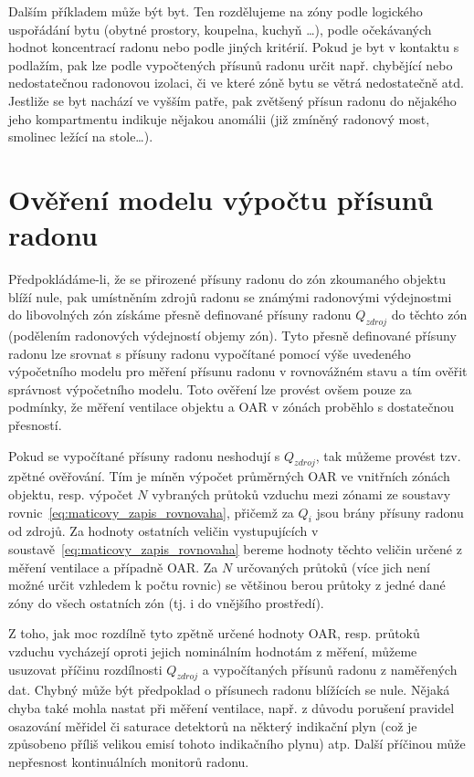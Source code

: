 Dalším příkladem může být byt. Ten rozdělujeme na zóny podle logického uspořádání bytu (obytné prostory, koupelna, kuchyň \ldots), podle očekávaných hodnot koncentrací radonu nebo podle jiných kritérií.
Pokud je byt v kontaktu s podlažím, pak lze podle vypočtených přísunů radonu určit např. chybějící nebo nedostatečnou radonovou izolaci, či ve které zóně bytu se větrá nedostatečně atd. Jestliže se byt nachází ve vyšším patře, pak zvětšený přísun radonu do nějakého jeho kompartmentu indikuje nějakou anomálii (již zmíněný radonový most, smolinec ležící na stole\ldots).


\section{Ověření modelu výpočtu přísunů radonu}\label{navesti:model_overeni}
Předpokládáme-li, že se přirozené přísuny radonu do zón zkoumaného objektu blíží nule, pak umístněním zdrojů radonu se známými radonovými výdejnostmi do libovolných zón získáme přesně definované přísuny radonu $Q_{zdroj}$ do těchto zón (podělením radonových výdejností objemy zón). Tyto přesně definované přísuny radonu lze srovnat s přísuny radonu vypočítané pomocí výše uvedeného výpočetního modelu pro měření přísunu radonu v rovnovážném stavu a tím ověřit správnost výpočetního modelu. Toto ověření lze provést ovšem pouze za podmínky, že měření ventilace objektu a OAR v zónách proběhlo s dostatečnou přesností.

Pokud se vypočítané přísuny radonu neshodují s $Q_{zdroj}$, tak můžeme provést tzv. zpětné ověřování. Tím je míněn výpočet průměrných OAR ve vnitřních zónách objektu, resp. výpočet $N$ vybraných průtoků vzduchu mezi zónami ze soustavy rovnic~\eqref{eq:maticovy_zapis_rovnovaha}, přičemž za $Q_i$ jsou brány přísuny radonu od zdrojů. Za hodnoty ostatních veličin vystupujících v soustavě~\eqref{eq:maticovy_zapis_rovnovaha} bereme hodnoty těchto veličin určené z měření ventilace a případně OAR. Za $N$ určovaných průtoků (více jich není možné určit vzhledem k počtu rovnic) se většinou berou průtoky z jedné dané zóny do všech ostatních zón (tj. i do vnějšího prostředí).

Z toho, jak moc rozdílně tyto zpětně určené hodnoty OAR, resp. průtoků vzduchu vycházejí oproti jejich nominálním hodnotám z měření, můžeme usuzovat příčinu rozdílnosti $Q_{zdroj}$ a vypočítaných přísunů radonu z naměřených dat. Chybný může být předpoklad o přísunech radonu blížících se nule. Nějaká chyba také mohla nastat při měření ventilace, např. z důvodu porušení pravidel osazování měřidel či saturace detektorů na některý indikační plyn (což je způsobeno příliš velikou emisí tohoto indikačního plynu) atp. Další příčinou může nepřesnost kontinuálních monitorů radonu.

